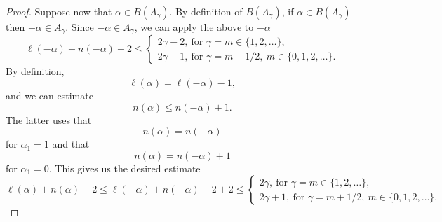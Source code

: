 \documentclass[10pt,a4paper]{amsart}
\begin{document}
\begin{proof}
Suppose now that $\alpha \in B(A_{\gamma})$. By definition of $B(A_{\gamma})$, if $\alpha \in B(A_{\gamma})$ then $-\alpha \in A_{\gamma}$. Since $-\alpha \in A_{\gamma}$, we can apply the above to $-\alpha$
\begin{equation*}
\ell(-\alpha) + n(-\alpha) - 2 \leq \begin{cases} 2 \gamma - 2,\ \text{for } \gamma = m \in \{1,2,\ldots \},\\ 2 \gamma - 1,\ \text{for } \gamma = m + 1/2,\ m \in \{0,1,2,\ldots \}. \end{cases}
\end{equation*}
By definition,
\begin{equation*}
\ell(\alpha) = \ell(-\alpha) - 1,
\end{equation*}
and we can estimate
\begin{equation*}
n(\alpha) \leq n(-\alpha)+1.
\end{equation*}
The latter uses that
\begin{equation*}
n(\alpha) = n(-\alpha)
\end{equation*}
for $\alpha_{1}=1$ and that
\begin{equation*}
n(\alpha) = n(-\alpha) +1
\end{equation*}
for $\alpha_{1} = 0$. This gives us the desired estimate
\begin{equation*}
\ell(\alpha) + n(\alpha) - 2 \leq \ell(-\alpha) + n(-\alpha) - 2 + 2 \leq \begin{cases} 2 \gamma,\ \text{for } \gamma = m \in \{1,2,\ldots \},\\ 2 \gamma + 1,\ \text{for } \gamma = m + 1/2,\ m \in \{0,1,2,\ldots \}. \end{cases}
\end{equation*}
\end{proof}
\end{document}
